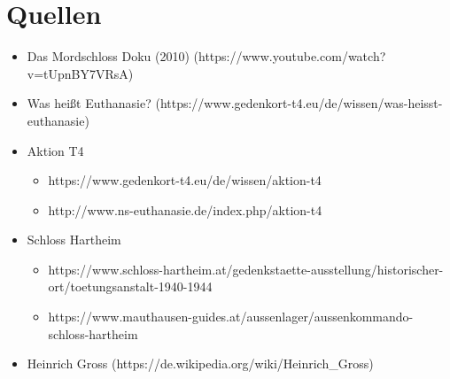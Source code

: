 \documentclass[a4paper, ngerman]{article}
\begin{document}
\section*{Quellen}
\begin{itemize}
    \item Das Mordschloss Doku (2010) (https://www.youtube.com/watch?v=tUpnBY7VRsA)
    \item Was heißt Euthanasie? (https://www.gedenkort-t4.eu/de/wissen/was-heisst-euthanasie)
    \item Aktion T4
          \begin{itemize}
              \item https://www.gedenkort-t4.eu/de/wissen/aktion-t4
              \item http://www.ns-euthanasie.de/index.php/aktion-t4
          \end{itemize}
    \item Schloss Hartheim
          \begin{itemize}
              \item https://www.schloss-hartheim.at/gedenkstaette-ausstellung/historischer-ort/toetungsanstalt-1940-1944
              \item https://www.mauthausen-guides.at/aussenlager/aussenkommando-schloss-hartheim
          \end{itemize}
    \item Heinrich Gross (https://de.wikipedia.org/wiki/Heinrich\_Gross)
\end{itemize}
\end{document}
